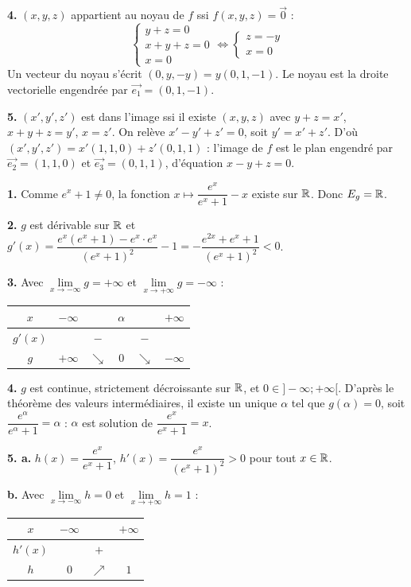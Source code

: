 \documentclass[11pt]{article}
\begin{document}
\textbf{4.} $(x,y,z)$ appartient au noyau de $f$ ssi $f(x,y,z) = \vec{0}$ :
\[ \begin{cases} y + z = 0 \\ x + y + z = 0 \\ x = 0 \end{cases} \Longleftrightarrow \begin{cases} z = -y \\ x = 0 \end{cases} \]
Un vecteur du noyau s'écrit $(0, y, -y) = y(0, 1, -1)$. Le noyau est la droite vectorielle engendrée par $\vec{e_1} = (0, 1, -1)$.

\textbf{5.} $(x',y',z')$ est dans l'image ssi il existe $(x,y,z)$ avec $y+z=x'$, $x+y+z=y'$, $x=z'$. On relève $x' - y' + z' = 0$, soit $y' = x' + z'$. D'où $(x',y',z') = x'(1,1,0) + z'(0,1,1)$ : l'image de $f$ est le plan engendré par $\vec{e_2} = (1,1,0)$ et $\vec{e_3} = (0,1,1)$, d'équation $x - y + z = 0$.

\textbf{1.} Comme $e^x + 1 \ne 0$, la fonction $x \mapsto \dfrac{e^x}{e^x + 1} - x$ existe sur $\mathbb{R}$. Donc $E_g = \mathbb{R}$.

\textbf{2.} $g$ est dérivable sur $\mathbb{R}$ et $g'(x) = \dfrac{e^x(e^x+1) - e^x\cdot e^x}{(e^x+1)^2} - 1 = -\dfrac{e^{2x} + e^x + 1}{(e^x+1)^2} < 0$.

\textbf{3.} Avec $\lim\limits_{x\to-\infty} g = +\infty$ et $\lim\limits_{x\to+\infty} g = -\infty$ :
\begin{center}\renewcommand{\arraystretch}{1.4}
\begin{tabular}{|c|ccccc|}
\hline $x$ & $-\infty$ & & $\alpha$ & & $+\infty$ \\\hline $g'(x)$ & & $-$ & & $-$ & \\\hline $g$ & $+\infty$ & $\searrow$ & $0$ & $\searrow$ & $-\infty$ \\\hline
\end{tabular}
\end{center}

\textbf{4.} $g$ est continue, strictement décroissante sur $\mathbb{R}$, et $0 \in ]-\infty;+\infty[$. D'après le théorème des valeurs intermédiaires, il existe un unique $\alpha$ tel que $g(\alpha) = 0$, soit $\dfrac{e^\alpha}{e^\alpha + 1} = \alpha$ : $\alpha$ est solution de $\dfrac{e^x}{e^x+1} = x$.

\textbf{5. a.} $h(x) = \dfrac{e^x}{e^x+1}$, $h'(x) = \dfrac{e^x}{(e^x+1)^2} > 0$ pour tout $x \in \mathbb{R}$.

\textbf{b.} Avec $\lim\limits_{x\to-\infty} h = 0$ et $\lim\limits_{x\to+\infty} h = 1$ :
\begin{center}\renewcommand{\arraystretch}{1.4}
\begin{tabular}{|c|ccc|}
\hline $x$ & $-\infty$ & & $+\infty$ \\\hline $h'(x)$ & & $+$ & \\\hline $h$ & $0$ & $\nearrow$ & $1$ \\\hline
\end{tabular}
\end{center}
\end{document}
